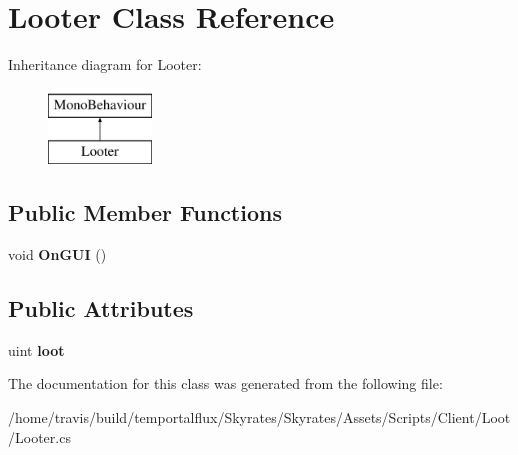 \hypertarget{class_looter}{\section{Looter Class Reference}
\label{class_looter}
}
Inheritance diagram for Looter\-:\begin{figure}[H]
\begin{center}
\leavevmode
\includegraphics[height=2.000000cm]{class_looter}
\end{center}
\end{figure}
\subsection*{Public Member Functions}
\begin{DoxyCompactItemize}
\item 
\hypertarget{class_looter_abf65984ed890944e4dcc4abf567d83a5}{void {\bfseries On\-G\-U\-I} ()}\label{class_looter_abf65984ed890944e4dcc4abf567d83a5}

\end{DoxyCompactItemize}
\subsection*{Public Attributes}
\begin{DoxyCompactItemize}
\item 
\hypertarget{class_looter_a51240a93eebac0a05b0da569e9a050a0}{uint {\bfseries loot}}\label{class_looter_a51240a93eebac0a05b0da569e9a050a0}

\end{DoxyCompactItemize}


The documentation for this class was generated from the following file\-:\begin{DoxyCompactItemize}
\item 
/home/travis/build/temportalflux/\-Skyrates/\-Skyrates/\-Assets/\-Scripts/\-Client/\-Loot/Looter.\-cs\end{DoxyCompactItemize}

